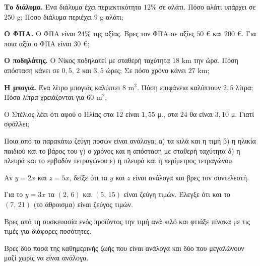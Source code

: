 \ex \textbf{Το διάλυμα.} Ένα διάλυμα έχει περιεκτικότητα $12\%$ σε αλάτι. Πόσο αλάτι υπάρχει σε $250$ g; Πόσο διάλυμα περιέχει $9$ g αλάτι;

\ex \textbf{Ο ΦΠΑ.} Ο ΦΠΑ είναι $24\%$ της αξίας. Βρες τον ΦΠΑ σε αξίες $50$ € και $200$ €. Για ποια αξία ο ΦΠΑ είναι $30$ €;

\ex \textbf{Ο ποδηλάτης.} Ο Νίκος ποδηλατεί με σταθερή ταχύτητα $18$ km την ώρα. Πόση απόσταση κάνει σε $0{,}5$, $2$ και $3{,}5$ ώρες; Σε πόσο χρόνο κάνει $27$ km;

\ex \textbf{Η μπογιά.} Ένα λίτρο μπογιάς καλύπτει $8$ m$^2$. Πόση επιφάνεια καλύπτουν $2{,}5$ λίτρα; Πόσα λίτρα χρειάζονται για $60$ m$^2$;


\ex Ο Στέλιος λέει ότι αφού ο Ηλίας στα $12$ είναι $1{,}55$ μ., στα $24$ θα είναι $3{,}10$ μ. Γιατί σφάλλει;

\ex Ποια από τα παρακάτω ζεύγη ποσών είναι ανάλογα; α) τα κιλά και η τιμή \quad β) η ηλικία παιδιού και το βάρος του \quad γ) ο χρόνος και η απόσταση με σταθερή ταχύτητα \quad δ) η πλευρά και το εμβαδόν τετραγώνου \quad ε) η πλευρά και η περίμετρος τετραγώνου.

\ex Αν $y=2x$ και $z=5x$, δείξε ότι τα $y$ και $z$ είναι ανάλογα και βρες τον συντελεστή.

\ex Για το $y=3x$ τα $(2,\,6)$ και $(5,\,15)$ είναι ζεύγη τιμών. Έλεγξε ότι και το $(7,\,21)$ (το άθροισμα) είναι ζεύγος τιμών.


\ex Βρες από τη συσκευασία ενός προϊόντος την τιμή ανά κιλό και φτιάξε πίνακα με τις τιμές για διάφορες ποσότητες.

\ex Βρες δύο ποσά της καθημερινής ζωής που είναι ανάλογα και δύο που μεγαλώνουν μαζί χωρίς να είναι ανάλογα.
